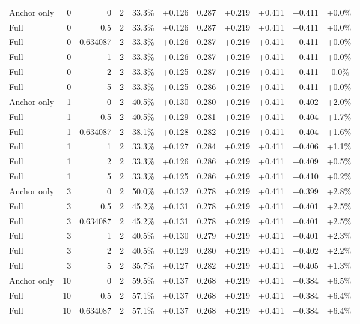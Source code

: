 \begin{table}[htbp]
\begin{tabular}{lrrrccccccc}
Anchor only & 0 & 0 & 2 & 33.3\% & +0.126 & 0.287 & +0.219 & +0.411 & +0.411 & +0.0\% \\
Full & 0 & 0.5 & 2 & 33.3\% & +0.126 & 0.287 & +0.219 & +0.411 & +0.411 & +0.0\% \\
Full & 0 & 0.634087 & 2 & 33.3\% & +0.126 & 0.287 & +0.219 & +0.411 & +0.411 & +0.0\% \\
Full & 0 & 1 & 2 & 33.3\% & +0.126 & 0.287 & +0.219 & +0.411 & +0.411 & +0.0\% \\
Full & 0 & 2 & 2 & 33.3\% & +0.125 & 0.287 & +0.219 & +0.411 & +0.411 & -0.0\% \\
Full & 0 & 5 & 2 & 33.3\% & +0.125 & 0.286 & +0.219 & +0.411 & +0.411 & +0.0\% \\
Anchor only & 1 & 0 & 2 & 40.5\% & +0.130 & 0.280 & +0.219 & +0.411 & +0.402 & +2.0\% \\
Full & 1 & 0.5 & 2 & 40.5\% & +0.129 & 0.281 & +0.219 & +0.411 & +0.404 & +1.7\% \\
Full & 1 & 0.634087 & 2 & 38.1\% & +0.128 & 0.282 & +0.219 & +0.411 & +0.404 & +1.6\% \\
Full & 1 & 1 & 2 & 33.3\% & +0.127 & 0.284 & +0.219 & +0.411 & +0.406 & +1.1\% \\
Full & 1 & 2 & 2 & 33.3\% & +0.126 & 0.286 & +0.219 & +0.411 & +0.409 & +0.5\% \\
Full & 1 & 5 & 2 & 33.3\% & +0.125 & 0.286 & +0.219 & +0.411 & +0.410 & +0.2\% \\
Anchor only & 3 & 0 & 2 & 50.0\% & +0.132 & 0.278 & +0.219 & +0.411 & +0.399 & +2.8\% \\
Full & 3 & 0.5 & 2 & 45.2\% & +0.131 & 0.278 & +0.219 & +0.411 & +0.401 & +2.5\% \\
Full & 3 & 0.634087 & 2 & 45.2\% & +0.131 & 0.278 & +0.219 & +0.411 & +0.401 & +2.5\% \\
Full & 3 & 1 & 2 & 40.5\% & +0.130 & 0.279 & +0.219 & +0.411 & +0.401 & +2.3\% \\
Full & 3 & 2 & 2 & 40.5\% & +0.129 & 0.280 & +0.219 & +0.411 & +0.402 & +2.2\% \\
Full & 3 & 5 & 2 & 35.7\% & +0.127 & 0.282 & +0.219 & +0.411 & +0.405 & +1.3\% \\
Anchor only & 10 & 0 & 2 & 59.5\% & +0.137 & 0.268 & +0.219 & +0.411 & +0.384 & +6.5\% \\
Full & 10 & 0.5 & 2 & 57.1\% & +0.137 & 0.268 & +0.219 & +0.411 & +0.384 & +6.4\% \\
Full & 10 & 0.634087 & 2 & 57.1\% & +0.137 & 0.268 & +0.219 & +0.411 & +0.384 & +6.4\% \\

\end{tabular}
\end{table}
